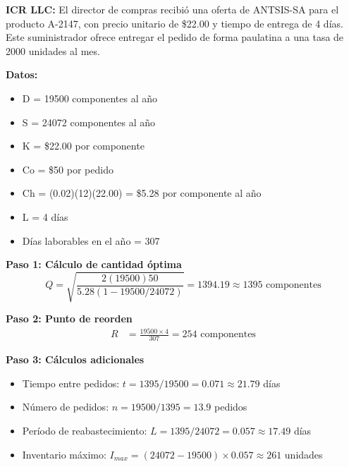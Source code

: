 \documentclass[12pt,a4paper]{book}
\begin{document}
	\begin{tcolorbox}[enhanced,colback=violetaclaro,colframe=moradoacento,boxrule=2pt,arc=8pt,
		drop shadow,title={\bfseries\color{white} \faPuzzlePiece\ PROBLEMA}]
		
		\textbf{ICR LLC:} El director de compras recibió una oferta de ANTSIS-SA para el producto A-2147, con precio unitario de \$22.00 y tiempo de entrega de 4 días. Este suministrador ofrece entregar el pedido de forma paulatina a una tasa de 2000 unidades al mes.
		
		\textbf{Datos:}
		\begin{itemize}[leftmargin=*,label=\textcolor{azulprincipal}{\faArrowRight}]
			\item D = 19500 componentes al año
			\item S = 24072 componentes al año
			\item K = \$22.00 por componente
			\item Co = \$50 por pedido
			\item Ch = (0.02)(12)(22.00) = \$5.28 por componente al año
			\item L = 4 días
			\item Días laborables en el año = 307
		\end{itemize}
		
	\end{tcolorbox}
	
	\begin{tcolorbox}[enhanced,colback=azulclaro,colframe=azulprincipal,boxrule=2pt,arc=8pt,
		title={\bfseries\color{white} \faCalculator\ SOLUCIÓN PASO A PASO}]
		
		\textbf{Paso 1: Cálculo de cantidad óptima}
		\begin{equation}
			Q = \sqrt{\frac{2(19500)50}{5.28(1-19500/24072)}} = 1394.19 \approx 1395 \text{ componentes}
		\end{equation}
		
		\textbf{Paso 2: Punto de reorden}
		\begin{align}
			R &= \frac{19500 \times 4}{307} = 254 \text{ componentes}
		\end{align}
		
		\textbf{Paso 3: Cálculos adicionales}
		\begin{itemize}[leftmargin=*,label=\textcolor{verdeprincipal}{\faCheck}]
			\item Tiempo entre pedidos: $t = 1395/19500 = 0.071 \approx 21.79$ días
			\item Número de pedidos: $n = 19500/1395 = 13.9$ pedidos
			\item Período de reabastecimiento: $L = 1395/24072 = 0.057 \approx 17.49$ días
			\item Inventario máximo: $I_{max} = (24072 - 19500) \times 0.057 \approx 261$ unidades
		\end{itemize}
		
	\end{tcolorbox}
	
\end{document}
